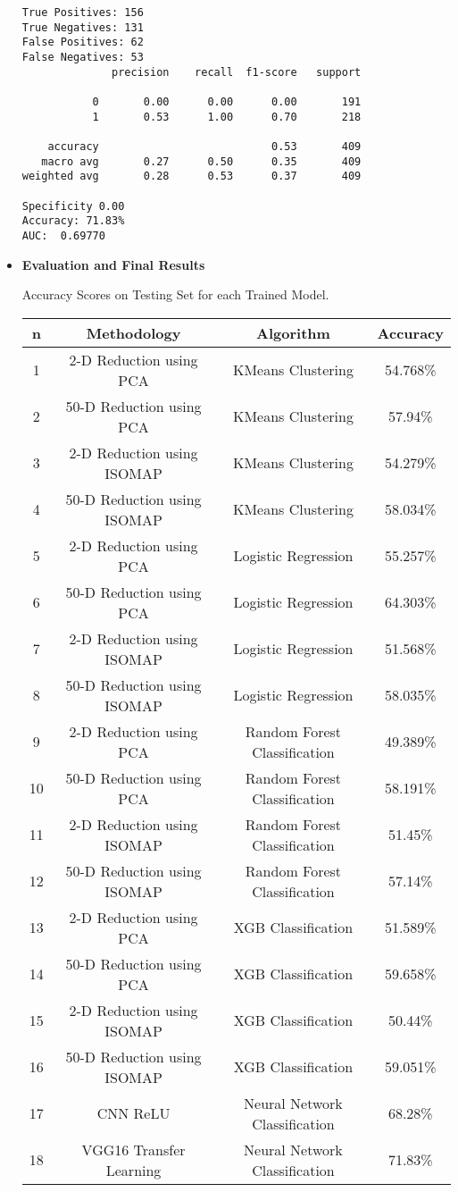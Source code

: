 \documentclass{article}
\begin{document}
\begin{titlepage}
\begin{itemize}
\begin{verbatim}
True Positives: 156
True Negatives: 131
False Positives: 62
False Negatives: 53
              precision    recall  f1-score   support

           0       0.00      0.00      0.00       191
           1       0.53      1.00      0.70       218

    accuracy                           0.53       409
   macro avg       0.27      0.50      0.35       409
weighted avg       0.28      0.53      0.37       409

Specificity 0.00
Accuracy: 71.83%
AUC:  0.69770
\end{verbatim}

\newpage


            \item[] \textbf{Evaluation and Final Results}

\begin{center}
\caption{Accuracy Scores on Testing Set for each Trained Model.}
\vspace{0.1in}
\begin{tabular}{|c|c|c|c|}\hline
n & Methodology & Algorithm & Accuracy \\\hline
1 & 2-D Reduction using PCA & KMeans Clustering & 54.768\% \\
2 & 50-D Reduction using PCA & KMeans Clustering & 57.94\% \\
3 & 2-D Reduction using ISOMAP & KMeans Clustering & 54.279\% \\
4 & 50-D Reduction using ISOMAP & KMeans Clustering & 58.034\% \\\hline
5 & 2-D Reduction using PCA & Logistic Regression & 55.257\% \\
6 & 50-D Reduction using PCA & Logistic Regression & 64.303\% \\
7 & 2-D Reduction using ISOMAP & Logistic Regression & 51.568\% \\
8 & 50-D Reduction using ISOMAP & Logistic Regression & 58.035\% \\\hline
9 & 2-D Reduction using PCA & Random Forest Classification & 49.389\% \\
10 & 50-D Reduction using PCA & Random Forest Classification & 58.191\% \\
11 & 2-D Reduction using ISOMAP & Random Forest Classification & 51.45\% \\
12 & 50-D Reduction using ISOMAP & Random Forest Classification & 57.14\% \\\hline
13 & 2-D Reduction using PCA & XGB Classification & 51.589\% \\
14 & 50-D Reduction using PCA & XGB Classification & 59.658\% \\
15 & 2-D Reduction using ISOMAP & XGB Classification & 50.44\% \\
16 & 50-D Reduction using ISOMAP & XGB Classification & 59.051\% \\\hline
17 & CNN ReLU & Neural Network Classification & 68.28\% \\
18 & VGG16 Transfer Learning & Neural Network Classification & 71.83\% \\
\hline
\end{tabular}
\end{center}



\end{itemize}
\end{titlepage}
\end{document}
